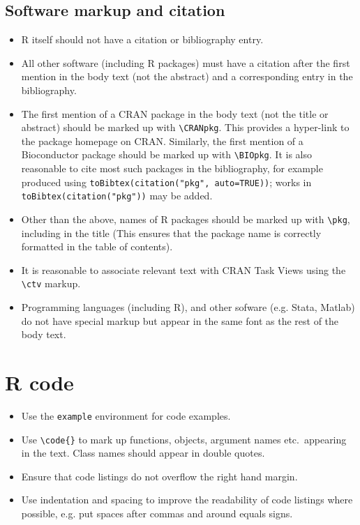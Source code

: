 \documentclass[11pt]{article}
\begin{document}
\subsection*{Software markup and citation}
\begin{itemize}
\item R itself should not have a citation or bibliography entry.
\item All other software (including R packages) must have a citation after
  the first mention in the body text (not the abstract) and a
  corresponding entry in the bibliography.
\item The first mention of a CRAN package in the body text (not the title or
  abstract) should be marked up with \verb+\CRANpkg+. This
  provides a hyper-link to the package homepage on CRAN. Similarly,
  the first mention of a Bioconductor package should be marked up with
  \verb+\BIOpkg+. It is also reasonable to cite most such packages in the
  bibliography, for example produced using 
  \verb+toBibtex(citation("pkg", auto=TRUE))+; works in 
  \verb+toBibtex(citation("pkg"))+ may be added.
\item Other than the above, names of R packages should be marked up with 
  \verb+\pkg+, including in the title (This ensures that the
  package name is correctly formatted in the table of contents).
\item It is reasonable to associate relevant text with CRAN Task Views using
  the \verb+\ctv+ markup.
\item Programming languages (including R), and other sofware
  (e.g. Stata, Matlab) do not have special markup but appear in the
  same font as the rest of the body text.
\end{itemize}

\section*{R code}

\begin{itemize}
\item Use the \verb|example| environment for code examples.
\item Use \verb+\code{}+ to mark up functions, objects, argument names etc.\
appearing in the text.  Class names should appear in double quotes.
\item Ensure that code listings do not overflow the right hand margin.
\item Use indentation and spacing to improve the readability of code
  listings where possible, e.g. put spaces after commas and around
  equals signs.
\end{itemize}
\end{document}

